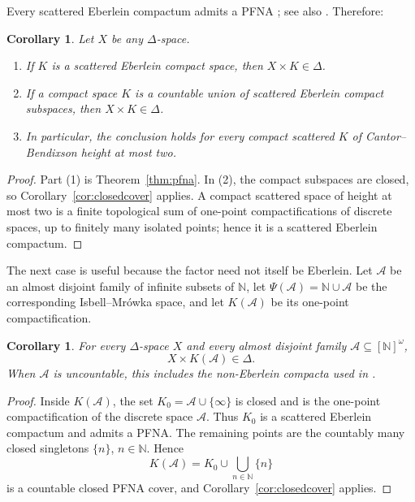 \documentclass[11pt]{article}
\newtheorem{corollary}[theorem]{Corollary}
\begin{document}
Every scattered Eberlein compactum admits a PFNA
\cite[Remark~2.4 and the discussion after Theorem~3.7]{KL}; see also
\cite[Section~6]{LS}.  Therefore:

\begin{corollary}\label{cor:compact}
Let $X$ be any $\Delta$-space.
\begin{enumerate}
\item If $K$ is a scattered Eberlein compact space, then $X\times K\in\Delta$.
\item If a compact space $K$ is a countable union of scattered Eberlein
compact subspaces, then $X\times K\in\Delta$.
\item In particular, the conclusion holds for every compact scattered $K$ of
Cantor--Bendixson height at most two.
\end{enumerate}
\end{corollary}

\begin{proof}
Part (1) is Theorem~\ref{thm:pfna}.  In (2), the compact subspaces are closed,
so Corollary~\ref{cor:closedcover} applies.  A compact scattered space of
height at most two is a finite topological sum of one-point compactifications
of discrete spaces, up to finitely many isolated points; hence it is a
scattered Eberlein compactum.
\end{proof}

The next case is useful because the factor need not itself be Eberlein.  Let
$\mathcal A$ be an almost disjoint family of infinite subsets of $\mathbb N$,
let $\Psi(\mathcal A)=\mathbb N\cup\mathcal A$ be the corresponding
Isbell--Mr\'owka space, and let $K(\mathcal A)$ be its one-point
compactification.

\begin{corollary}\label{cor:psi}
For every $\Delta$-space $X$ and every almost disjoint family
$\mathcal A\subseteq[\mathbb N]^{\omega}$,
\[
 X\times K(\mathcal A)\in\Delta.
\]
When $\mathcal A$ is uncountable, this includes the non-Eberlein compacta used
in \cite[Theorem~3.10]{KL}.
\end{corollary}

\begin{proof}
Inside $K(\mathcal A)$, the set
$K_0=\mathcal A\cup\{\infty\}$ is closed and is the one-point
compactification of the discrete space $\mathcal A$.  Thus $K_0$ is a
scattered Eberlein compactum and admits a PFNA.  The remaining points are the
countably many closed singletons $\{n\}$, $n\in\mathbb N$.  Hence
\[
 K(\mathcal A)=K_0\cup\bigcup_{n\in\mathbb N}\{n\}
\]
is a countable closed PFNA cover, and Corollary~\ref{cor:closedcover} applies.
\end{proof}
\end{document}
